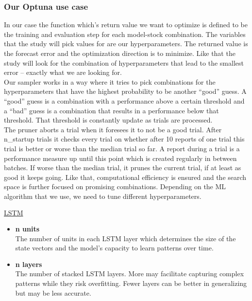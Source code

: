 \documentclass[a4paper,12pt]{report}
\begin{document}
				\subsubsection{Our Optuna use case}
In our case the function which’s return value we want to optimize is defined to be the training and evaluation step for each model-stock combination. The variables that the study will pick values for are our hyperparameters. The returned value is the forecast error and the optimization direction is to minimize. Like that the study will look for the combination of hyperparameters that lead to the smallest error – exactly what we are looking for. \\
Our sampler works in a way where it tries to pick combinations for the hyperparameters that have the highest probability to be another “good” guess. A “good” guess is a combination with a performance above a certain threshold and a “bad” guess is a combination that results in a performance below that threshold. That threshold is constantly update as trials are processed.\\
The pruner aborts a trial when it foresees it to not be a good trial. After n\_startup trials it checks every trial on whether after 10 reports of one trial this trial is better or worse than the median trial so far. A report during a trial is a performance measure up until this point which is created regularly in between batches. If worse than the median trial, it prunes the current trial, if at least as good it keeps going. Like that, computational efficiency is ensured and the search space is further focused on promising combinations. Depending on the ML algorithm that we use, we need to tune different hyperparameters.\\
\begin{minipage}{\textwidth}
\underline{LSTM}
\begin{itemize}
  \item \textbf{n units} \\
  The number of units in each LSTM layer which determines the size of the state vectors and the model’s capacity to learn patterns over time.

  \item \textbf{n layers} \\
  The number of stacked LSTM layers. More may facilitate capturing complex patterns while they risk overfitting. Fewer layers can be better in generalizing but may be less accurate.

\end{itemize}
\end{minipage}
\end{document}
